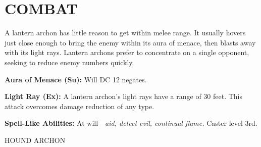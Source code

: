 \documentclass{article}
\begin{document}
\section*{COMBAT}

A lantern archon has little reason to get within melee range. It usually hovers 
just close enough to bring the enemy within its aura of menace, then blasts away 
with its light rays. Lantern archons prefer to concentrate on a single opponent, 
seeking to reduce enemy numbers quickly.

\textbf{Aura of Menace (Su):} Will DC 12 negates.

\textbf{Light Ray (Ex):} A lantern archon's light rays have a range of 30 feet. 
This attack overcomes damage reduction of any type.

\textbf{Spell-Like Abilities:} At will---\textit{aid, detect evil, continual flame. 
}Caster level 3rd.

\vspace{12pt}
HOUND ARCHON
\end{document}
